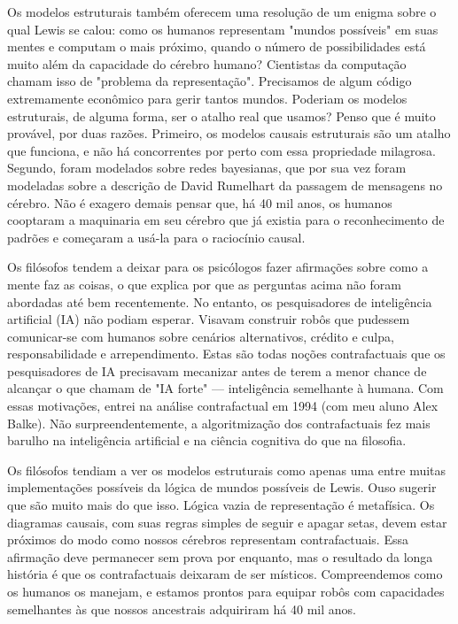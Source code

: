 \documentclass[11pt,a5paper,twoside]{book}
\begin{document}
Os modelos estruturais também oferecem uma resolução de um enigma sobre o qual Lewis se calou: como os humanos representam "mundos possíveis" em suas mentes e computam o mais próximo, quando o número de possibilidades está muito além da capacidade do cérebro humano? Cientistas da computação chamam isso de "problema da representação". Precisamos de algum código extremamente econômico para gerir tantos mundos. Poderiam os modelos estruturais, de alguma forma, ser o atalho real que usamos? Penso que é muito provável, por duas razões. Primeiro, os modelos causais estruturais são um atalho que funciona, e não há concorrentes por perto com essa propriedade milagrosa. Segundo, foram modelados sobre redes bayesianas, que por sua vez foram modeladas sobre a descrição de David Rumelhart da passagem de mensagens no cérebro. Não é exagero demais pensar que, há 40 mil anos, os humanos cooptaram a maquinaria em seu cérebro que já existia para o reconhecimento de padrões e começaram a usá-la para o raciocínio causal.

Os filósofos tendem a deixar para os psicólogos fazer afirmações sobre como a mente faz as coisas, o que explica por que as perguntas acima não foram abordadas até bem recentemente. No entanto, os pesquisadores de inteligência artificial (IA) não podiam esperar. Visavam construir robôs que pudessem comunicar-se com humanos sobre cenários alternativos, crédito e culpa, responsabilidade e arrependimento. Estas são todas noções contrafactuais que os pesquisadores de IA precisavam mecanizar antes de terem a menor chance de alcançar o que chamam de "IA forte" — inteligência semelhante à humana. Com essas motivações, entrei na análise contrafactual em 1994 (com meu aluno Alex Balke). Não surpreendentemente, a algoritmização dos contrafactuais fez mais barulho na inteligência artificial e na ciência cognitiva do que na filosofia.

Os filósofos tendiam a ver os modelos estruturais como apenas uma entre muitas implementações possíveis da lógica de mundos possíveis de Lewis. Ouso sugerir que são muito mais do que isso. Lógica vazia de representação é metafísica. Os diagramas causais, com suas regras simples de seguir e apagar setas, devem estar próximos do modo como nossos cérebros representam contrafactuais. Essa afirmação deve permanecer sem prova por enquanto, mas o resultado da longa história é que os contrafactuais deixaram de ser místicos. Compreendemos como os humanos os manejam, e estamos prontos para equipar robôs com capacidades semelhantes às que nossos ancestrais adquiriram há 40 mil anos.
\end{document}
